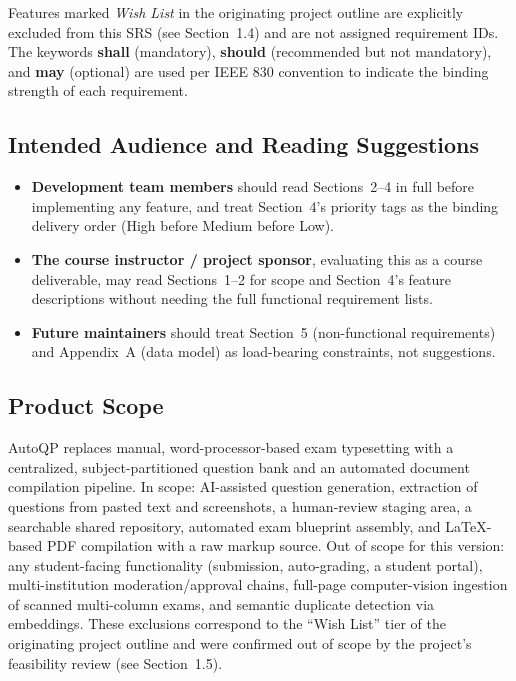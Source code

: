 \documentclass[11pt]{article}
\begin{document}
Features marked \emph{Wish List} in the originating project outline are
explicitly excluded from this SRS (see Section~1.4) and are not assigned
requirement IDs. The keywords \textbf{shall} (mandatory), \textbf{should}
(recommended but not mandatory), and \textbf{may} (optional) are used per
IEEE 830 convention to indicate the binding strength of each requirement.

\subsection{Intended Audience and Reading Suggestions}
\begin{itemize}[nosep]
  \item \textbf{Development team members} should read Sections~2--4 in full
    before implementing any feature, and treat Section~4's priority tags as
    the binding delivery order (High before Medium before Low).
  \item \textbf{The course instructor / project sponsor}, evaluating this as
    a course deliverable, may read Sections~1--2 for scope and Section~4's
    feature descriptions without needing the full functional requirement
    lists.
  \item \textbf{Future maintainers} should treat Section~5 (non-functional
    requirements) and Appendix~A (data model) as load-bearing constraints,
    not suggestions.
\end{itemize}

\subsection{Product Scope}
AutoQP replaces manual, word-processor-based exam typesetting with a
centralized, subject-partitioned question bank and an automated document
compilation pipeline. In scope: AI-assisted question generation, extraction
of questions from pasted text and screenshots, a human-review staging area,
a searchable shared repository, automated exam blueprint assembly, and
LaTeX-based PDF compilation with a raw markup source. Out of scope for this
version: any student-facing functionality (submission, auto-grading, a
student portal), multi-institution moderation/approval chains, full-page
computer-vision ingestion of scanned multi-column exams, and semantic
duplicate detection via embeddings. These exclusions correspond to the
``Wish List'' tier of the originating project outline and were confirmed
out of scope by the project's feasibility review (see Section~1.5).
\end{document}
